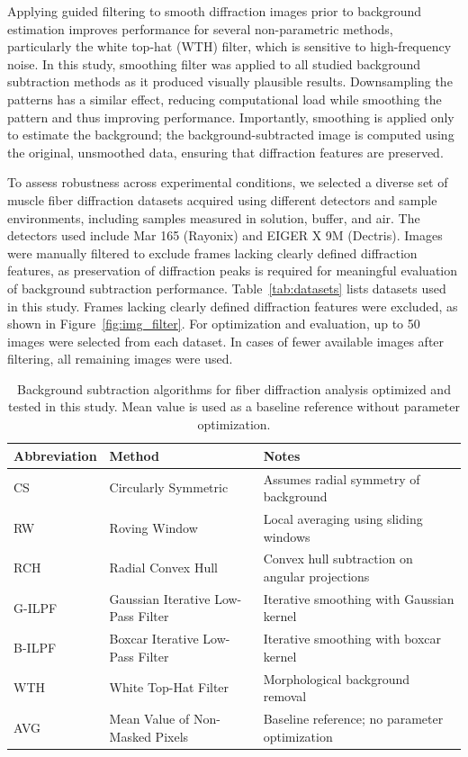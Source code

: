 \documentclass[iucr]{iucrjournals}
\begin{document}
Applying guided filtering to smooth diffraction images prior to background estimation improves performance for several non-parametric methods, particularly the white top-hat (WTH) filter, which is sensitive to high-frequency noise. In this study, smoothing filter was applied to all studied background subtraction methods as it produced visually plausible results. Downsampling the patterns has a similar effect, reducing computational load while smoothing the pattern and thus improving performance. Importantly, smoothing is applied only to estimate the background; the background-subtracted image is computed using the original, unsmoothed data, ensuring that diffraction features are preserved.

To assess robustness across experimental conditions, we selected a diverse set of muscle fiber diffraction datasets acquired using different detectors and sample environments, including samples measured in solution, buffer, and air. The detectors used include Mar 165 (Rayonix) and EIGER X 9M (Dectris). Images were manually filtered to exclude frames lacking clearly defined diffraction features, as preservation of diffraction peaks is required for meaningful evaluation of background subtraction performance. Table~\ref{tab:datasets} lists datasets used in this study. Frames lacking clearly defined diffraction features were excluded, as shown in Figure~\ref{fig:img_filter}. For optimization and evaluation, up to 50 images were selected from each dataset. In cases of fewer available images after filtering, all remaining images were used.

\begin{table}[t]
\caption{Background subtraction algorithms for fiber diffraction analysis optimized and tested in this study. Mean value is used as a baseline reference without parameter optimization.}
\label{tab:algorithms}
\centering
\small
\setlength{\tabcolsep}{6pt}
\renewcommand{\arraystretch}{1.1}
\begin{tabular}{@{}lll@{}}
\toprule
\textbf{Abbreviation} & \textbf{Method} & \textbf{Notes} \\
\midrule
CS & Circularly Symmetric & Assumes radial symmetry of background \\
RW & Roving Window & Local averaging using sliding windows \\
RCH & Radial Convex Hull & Convex hull subtraction on angular projections \\
G-ILPF & Gaussian Iterative Low-Pass Filter & Iterative smoothing with Gaussian kernel \\
B-ILPF & Boxcar Iterative Low-Pass Filter & Iterative smoothing with boxcar kernel \\
WTH & White Top-Hat Filter & Morphological background removal \\
\midrule
AVG & Mean Value of Non-Masked Pixels & Baseline reference; no parameter optimization \\
\bottomrule
\end{tabular}
\end{table}
\end{document}
